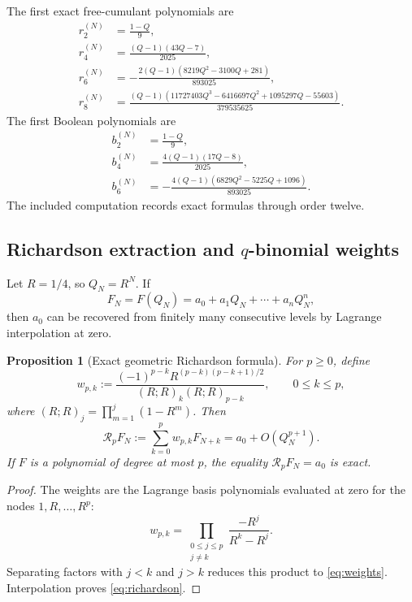 \documentclass[11pt]{article}
\newtheorem{proposition}[theorem]{Proposition}
\theoremstyle{definition}
\begin{document}
The first exact free-cumulant polynomials are
\begin{align}
r_2^{(N)}&=\frac{1-Q}{9},\label{eq:finiteR2}\\
r_4^{(N)}&=\frac{(Q-1)(43Q-7)}{2025},\label{eq:finiteR4}\\
r_6^{(N)}&=-\frac{2(Q-1)(8219Q^2-3100Q+281)}{893025},\label{eq:finiteR6}\\
r_8^{(N)}&=\frac{(Q-1)(11727403Q^3-6416697Q^2+1095297Q-55603)}{379535625}.
\label{eq:finiteR8}
\end{align}
The first Boolean polynomials are
\begin{align}
b_2^{(N)}&=\frac{1-Q}{9},\\
b_4^{(N)}&=\frac{4(Q-1)(17Q-8)}{2025},\\
b_6^{(N)}&=-\frac{4(Q-1)(6829Q^2-5225Q+1096)}{893025}.
\end{align}
The included computation records exact formulas through order twelve.

\subsection{Richardson extraction and \texorpdfstring{\(q\)}{q}-binomial weights}
Let \(R=1/4\), so \(Q_N=R^N\). If
\[
F_N=F(Q_N)=a_0+a_1Q_N+\cdots+a_nQ_N^n,
\]
then \(a_0\) can be recovered from finitely many consecutive levels by Lagrange interpolation at zero.

\begin{proposition}[Exact geometric Richardson formula]\label{prop:richardson}
For \(p\ge0\), define
\begin{equation}\label{eq:weights}
w_{p,k}:=
\frac{(-1)^{p-k}R^{(p-k)(p-k+1)/2}}
{(R;R)_k(R;R)_{p-k}},
\qquad 0\le k\le p,
\end{equation}
where \((R;R)_j=\prod_{m=1}^j(1-R^m)\). Then
\begin{equation}\label{eq:richardson}
\mathcal R_pF_N:=\sum_{k=0}^pw_{p,k}F_{N+k}
=a_0+O(Q_N^{p+1}).
\end{equation}
If \(F\) is a polynomial of degree at most \(p\), the equality \(\mathcal R_pF_N=a_0\) is exact.
\end{proposition}
\begin{proof}
The weights are the Lagrange basis polynomials evaluated at zero for the nodes \(1,R,\ldots,R^p\):
\[
w_{p,k}=\prod_{\substack{0\le j\le p\\j\ne k}}\frac{-R^j}{R^k-R^j}.
\]
Separating factors with \(j<k\) and \(j>k\) reduces this product to \eqref{eq:weights}. Interpolation proves \eqref{eq:richardson}.
\end{proof}
\end{document}
